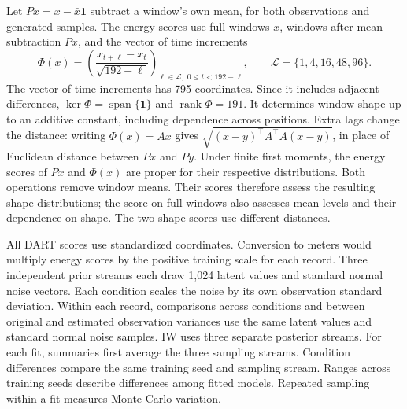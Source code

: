 \documentclass{article}
\begin{document}
Let $P x=x-\bar x\mathbf 1$ subtract a window's own mean, for both observations and generated samples. The energy scores use full windows $x$, windows after mean subtraction $Px$, and the vector of time increments
\begin{equation}
\Phi(x)=\left(\frac{x_{t+\ell}-x_t}{\sqrt{192-\ell}}\right)_{\ell\in\mathcal L,\;0\leq t<192-\ell},
\qquad \mathcal L=\{1,4,16,48,96\}.
\label{eq:increments}
\end{equation}
The vector of time increments has 795 coordinates. Since it includes adjacent differences, $\ker\Phi=\operatorname{span}\{\mathbf 1\}$ and $\operatorname{rank}\Phi=191$. It determines window shape up to an additive constant, including dependence across positions. Extra lags change the distance: writing $\Phi(x)=Ax$ gives $\sqrt{(x-y)^\top A^\top A(x-y)}$, in place of Euclidean distance between $Px$ and $Py$. Under finite first moments, the energy scores of $Px$ and $\Phi(x)$ are proper for their respective distributions. Both operations remove window means. Their scores therefore assess the resulting shape distributions; the score on full windows also assesses mean levels and their dependence on shape. The two shape scores use different distances.

All DART scores use standardized coordinates. Conversion to meters would multiply energy scores by the positive training scale for each record. Three independent prior streams each draw 1,024 latent values and standard normal noise vectors. Each condition scales the noise by its own observation standard deviation. Within each record, comparisons across conditions and between original and estimated observation variances use the same latent values and standard normal noise samples. IW uses three separate posterior streams. For each fit, summaries first average the three sampling streams. Condition differences compare the same training seed and sampling stream. Ranges across training seeds describe differences among fitted models. Repeated sampling within a fit measures Monte Carlo variation.
\end{document}
